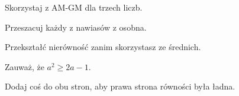 
\begin{hints_list}
	\item Skorzystaj z AM-GM dla trzech liczb.
	\item Przeszacuj każdy z nawiasów z osobna.
	\item Przekształć nierówność zanim skorzystasz ze średnich.
	\item Zauważ, że $a^2 \geqslant 2a - 1$.
	\item Dodaj coś do obu stron, aby prawa strona równości była ładna.
\end{hints_list}